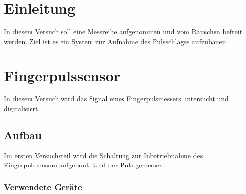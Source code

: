 \documentclass[12pt,a4paper]{article}
\begin{document}
\newpage
\tableofcontents
\newpage
\section{Einleitung}

In diesem Versuch soll eine Messreihe aufgenommen und vom Rauschen befreit werden.
Ziel ist es ein System zur Aufnahme des Pulsschlages aufzubauen.


\section{Fingerpulssensor}

In diesem Versuch wird das Signal eines Fingerpulsmessers untersucht und digitalisiert.

\subsection{Aufbau}

Im ersten Versuchsteil wird die Schaltung zur Inbetriebnahme des Fingerpulssensors aufgebaut. Und der Puls gemessen.

\subsubsection*{Verwendete Geräte}
\end{document}
